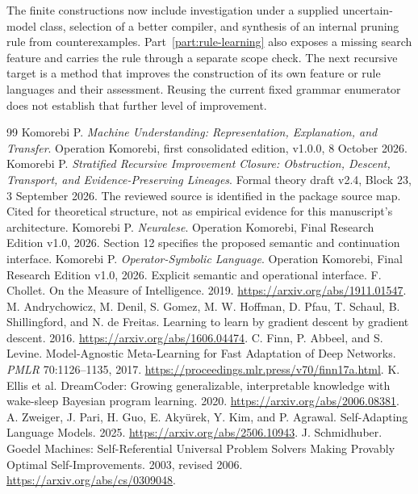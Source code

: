 \documentclass[11pt,letterpaper]{article}
\theoremstyle{plain}
\theoremstyle{definition}
\begin{document}
The finite constructions now include investigation under a supplied uncertain-model class, selection of a better compiler, and synthesis of an internal pruning rule from counterexamples. Part~\ref{part:rule-learning} also exposes a missing search feature and carries the rule through a separate scope check. The next recursive target is a method that improves the construction of its own feature or rule languages and their assessment. Reusing the current fixed grammar enumerator does not establish that further level of improvement.

\clearpage{}
\begin{thebibliography}{99}\fontsize{9.5}{11.2}\selectfont\setlength{\itemsep}{3pt}\setlength{\parskip}{0pt}
 Komorebi P. \emph{Machine Understanding: Representation, Explanation, and Transfer}. Operation Komorebi, first consolidated edition, v1.0.0, 8 October 2026.
 Komorebi P. \emph{Stratified Recursive Improvement Closure: Obstruction, Descent, Transport, and Evidence-Preserving Lineages}. Formal theory draft v2.4, Block 23, 3 September 2026. The reviewed source is identified in the package source map. Cited for theoretical structure, not as empirical evidence for this manuscript's architecture.
 Komorebi P. \emph{Neuralese}. Operation Komorebi, Final Research Edition v1.0, 2026. Section 12 specifies the proposed semantic and continuation interface.
 Komorebi P. \emph{Operator-Symbolic Language}. Operation Komorebi, Final Research Edition v1.0, 2026. Explicit semantic and operational interface.
 F. Chollet. On the Measure of Intelligence. 2019. \url{https://arxiv.org/abs/1911.01547}.
 M. Andrychowicz, M. Denil, S. Gomez, M. W. Hoffman, D. Pfau, T. Schaul, B. Shillingford, and N. de Freitas. Learning to learn by gradient descent by gradient descent. 2016. \url{https://arxiv.org/abs/1606.04474}.
 C. Finn, P. Abbeel, and S. Levine. Model-Agnostic Meta-Learning for Fast Adaptation of Deep Networks. \emph{PMLR} 70:1126--1135, 2017. \url{https://proceedings.mlr.press/v70/finn17a.html}.
 K. Ellis et al. DreamCoder: Growing generalizable, interpretable knowledge with wake-sleep Bayesian program learning. 2020. \url{https://arxiv.org/abs/2006.08381}.
 A. Zweiger, J. Pari, H. Guo, E. Aky\"urek, Y. Kim, and P. Agrawal. Self-Adapting Language Models. 2025. \url{https://arxiv.org/abs/2506.10943}.
 J. Schmidhuber. Goedel Machines: Self-Referential Universal Problem Solvers Making Provably Optimal Self-Improvements. 2003, revised 2006. \url{https://arxiv.org/abs/cs/0309048}.

\end{thebibliography}
\end{document}
